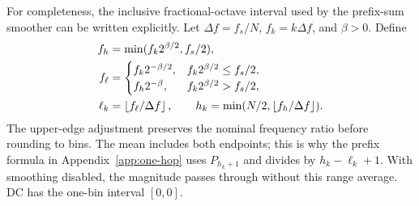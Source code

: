 For completeness, the inclusive fractional-octave interval used by the
prefix-sum smoother can be written explicitly. Let $\Delta f=f_s/N$,
$f_k=k\Delta f$, and $\beta>0$. Define
\begin{align}
 f_h&=\min(f_k2^{\beta/2},f_s/2),\\
 f_\ell&=\begin{cases}
 f_k2^{-\beta/2},&f_k2^{\beta/2}\le f_s/2,\\
 f_h2^{-\beta},&f_k2^{\beta/2}>f_s/2,
 \end{cases}\\
 \ell_k&=\left\lfloor f_\ell/\Delta f\right\rfloor,\qquad
 h_k=\min(N/2,\left\lfloor f_h/\Delta f\right\rfloor).
 \label{eq:octave-bounds}
\end{align}
The upper-edge adjustment preserves the nominal frequency ratio before
rounding to bins. The mean includes both endpoints; this is why the prefix
formula in Appendix~\ref{app:one-hop} uses $P_{h_k+1}$ and divides by
$h_k-\ell_k+1$. With smoothing disabled, the magnitude passes through
without this range average. DC has the one-bin interval $[0,0]$.

